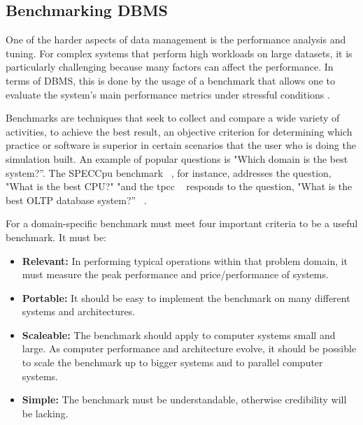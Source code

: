 
\subsection{Benchmarking DBMS}

One of the harder aspects of data management is the performance analysis and tuning. For complex systems that perform high workloads on large datasets, it is particularly challenging because many factors can affect the performance. In terms of DBMS, this is done by the usage of a benchmark that allows one to evaluate the system's main performance metrics under stressful conditions \cite{10.14778/2732240.2732246}.


Benchmarks are techniques that seek to collect and compare a wide variety of activities, to achieve the best result, an objective criterion for determining which practice or software is superior in certain scenarios that the user who
is doing the simulation built. An example of popular questions is "Which domain is the best system?”. The SPECCpu benchmark ~\cite{henning2006spec}, for instance, addresses the question, "What is the best CPU?" "and the \gls{tpcc} ~\cite{council2010tpc} responds to the question, "What is the best OLTP database system?” ~\cite{benchmarkchen,benchcloud}.

For \citeauthor{gray1992benchmark} a domain-specific benchmark must meet four important criteria to be a useful benchmark. It must be:

\begin{itemize}
    \item \textbf{Relevant:} In performing typical operations within that problem domain, it must measure the peak performance and price/performance of systems. 
    \item \textbf{Portable:} It should be easy to implement the benchmark on many different systems and architectures.
    \item \textbf{Scaleable:}  The benchmark should apply to computer systems small and large. As computer performance and architecture evolve, it should be possible to scale the benchmark up to bigger systems and to parallel computer systems.
    \item \textbf{Simple:} The benchmark must be understandable, otherwise credibility will be lacking.
\end{itemize}




